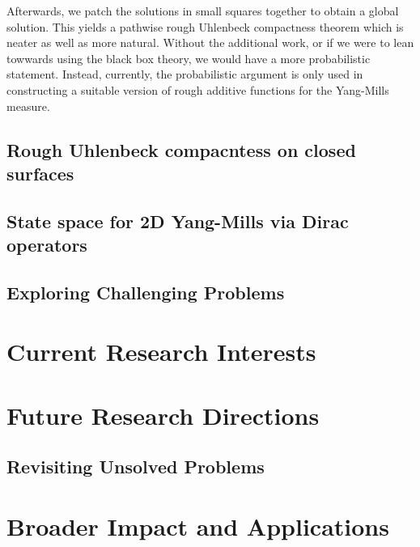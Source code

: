 \documentclass[./main.tex]{subfiles}
\begin{document}
Afterwards, we patch the solutions in small squares together to obtain a global solution. This yields a pathwise rough Uhlenbeck compactness theorem which is neater as well as more natural. Without the additional work, or if we were to lean towwards using the black box theory, we would have a more probabilistic statement. Instead, currently, the probabilistic argument  is only used in constructing a suitable version of rough additive functions for the Yang-Mills measure. 


\subsection{Rough Uhlenbeck compacntess on closed surfaces}

\subsection{State space for 2D Yang-Mills via Dirac operators}

\subsection{Exploring Challenging Problems}


\section{Current Research Interests}

\section{Future Research Directions}

\subsection{Revisiting Unsolved Problems}
\section{Broader Impact and Applications}
\end{document}

